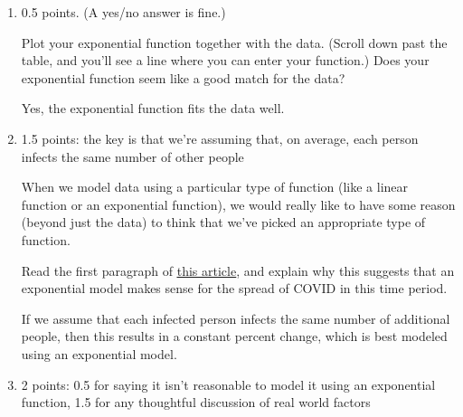 \documentclass{article}
\makeatletter
\let\@href=\href
\renewcommand{\href}[2]{\@href{#1}{\ul{#2}}}
\makeatother
\begin{document}
\begin{enumerate}
\begin{enumerate}
  \item

    \begin{grading}
      0.5 points. (A yes/no answer is fine.) 
    \end{grading}

    \begin{problem}[\vfill\newpage]
      Plot your exponential function together with the data. (Scroll down past the table, and you'll see a line where you can enter your function.) Does your exponential function seem like a good match for the data?
    \end{problem}

    \begin{solution}
      Yes, the exponential function fits the data well.
    \end{solution}

  \item

    \begin{grading}
      1.5 points: the key is that we're assuming that, on average, each person infects the same number of other people 
    \end{grading}

    \begin{problem}[\vfill]
      When we model data using a particular type of function (like a linear function or an exponential function), we would really like to have some reason (beyond just the data) to think that we've picked an appropriate type of function.

      Read the first paragraph of \href{https://canvas.harvard.edu/files/21213978/download?download_frd=1}{this article}, and explain why this suggests that an exponential model makes sense for the spread of COVID in this time period. 
    \end{problem}

    \begin{solution}
      If we assume that each infected person infects the same number of additional 
      people,
      then this results in a constant percent change, which is best modeled using
      an exponential model.
    \end{solution}

  \item

    \begin{grading}
      2 points: 0.5 for saying it isn't reasonable to model it using an exponential function, 1.5 for any thoughtful discussion of real world factors
    \end{grading}


\end{enumerate}
\end{enumerate}
\end{document}
